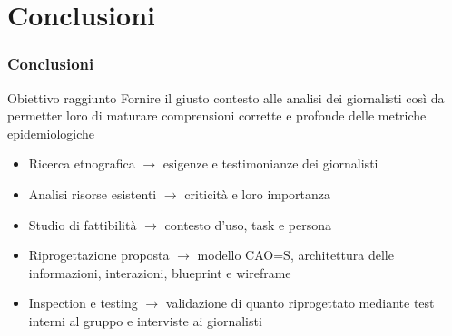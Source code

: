 \documentclass[handout]{beamer}
\begin{document}
	\section{Conclusioni}
		\begin{frame}
			\frametitle{Conclusioni}
			\begin{block}{Obiettivo raggiunto}
				Fornire il giusto contesto alle analisi dei giornalisti così da permetter loro di maturare comprensioni corrette e profonde delle metriche epidemiologiche
			\end{block}
			\begin{itemize}[<+->]
				\item Ricerca etnografica $\rightarrow$ esigenze e testimonianze dei giornalisti\\
				\item Analisi risorse esistenti $\rightarrow$ criticità e loro importanza\\
				\item Studio di fattibilità $\rightarrow$ contesto d'uso, task e persona\\
				\item Riprogettazione proposta $\rightarrow$ modello CAO=S, architettura delle informazioni, interazioni, blueprint e wireframe\\
				\item Inspection e testing $\rightarrow$ validazione di quanto riprogettato mediante test interni al gruppo e interviste ai giornalisti\\
			\end{itemize}
		\end{frame}
\end{document}
